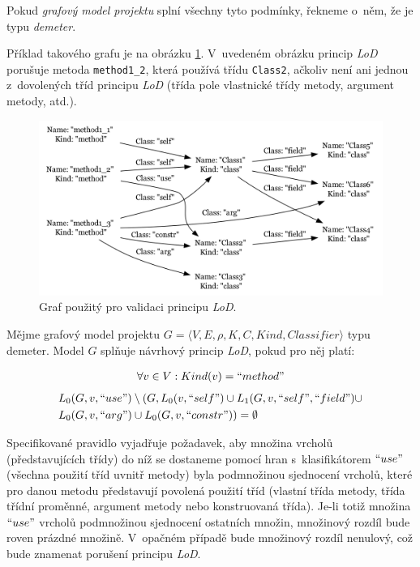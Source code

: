 Pokud \emph{grafový model projektu} splní všechny tyto podmínky, řekneme o~něm, že je typu \emph{demeter}.

Příklad takového grafu je na obrázku \ref{implementation-lod_graph}. V~uvedeném obrázku princip \emph{LoD} porušuje metoda \verb-method1_2-, která používá třídu \verb-Class2-, ačkoliv není ani jednou z~dovolených tříd principu \emph{LoD} (třída pole vlastnické třídy metody, argument metody, atd.).

\begin{figure}[h!]
  \centering
  \includegraphics[width=1.0\textwidth]{./graphs/demeter_graph.png}
  \caption{Graf  použitý pro validaci principu \emph{LoD}.\label{implementation-lod_graph}}
\end{figure}

\begin{designprinciple}
Mějme grafový model projektu $G = \langle V, E, \rho, K, C, \mathit{Kind}, \mathit{Classifier}\rangle$ typu demeter. Model $G$ splňuje návrhový princip \emph{LoD}, pokud pro něj platí:

\begin{align*}
\forall v \in V: Kind(v) = ``method"\\
\end{align*}
\begin{align*}
&L_0(G, v, ``use") \setminus (G, L_0(v, ``self") \cup L_1(G, v, ``self", ``field") \cup \\
&L_0(G, v, ``arg") \cup L_0(G, v, ``constr")) = \emptyset
\end{align*}

\end{designprinciple}

Specifikované pravidlo vyjadřuje požadavek, aby množina vrcholů (představujících třídy) do níž se dostaneme pomocí hran s~klasifikátorem $``use"$ (všechna použití tříd uvnitř metody) byla podmnožinou sjednocení vrcholů, které pro danou metodu představují povolená použití tříd (vlastní třída metody, třída třídní proměnné, argument metody nebo konstruovaná třída). Je-li totiž množina $``use"$ vrcholů podmnožinou sjednocení ostatních množin, množinový rozdíl bude roven prázdné množině. V~opačném případě bude množinový rozdíl nenulový, což bude znamenat porušení principu \emph{LoD}.

